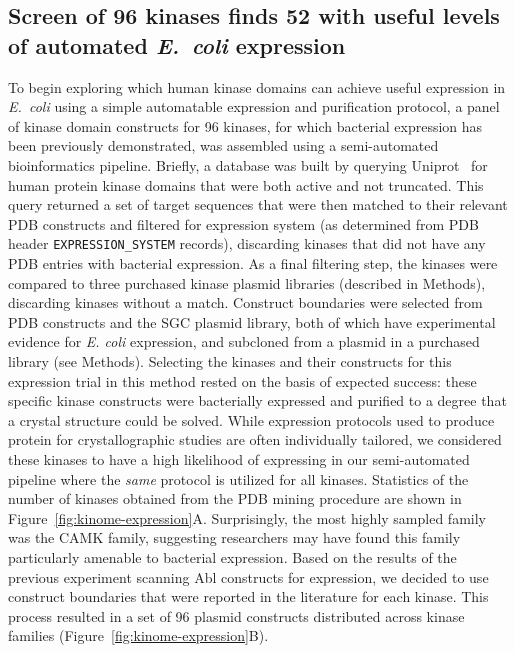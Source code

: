 \documentclass[phd,tocprelim]{cornell}
\begin{document}
\subsection{Screen of 96 kinases finds 52 with useful levels of automated \emph{E.~coli} expression}
To begin exploring which human kinase domains can achieve useful expression in \emph{E.~coli} using a simple automatable expression and purification protocol, a panel of kinase domain constructs for 96 kinases, for which bacterial expression has been previously demonstrated, was assembled using a semi-automated bioinformatics pipeline. 
Briefly, a database was built by querying Uniprot~\citep{uniprot:2017} for human protein kinase domains that were both active and not truncated. 
This query returned a set of target sequences that were then matched to their relevant PDB constructs and filtered for expression system (as determined from PDB header {\tt EXPRESSION\_SYSTEM} records), discarding kinases that did not have any PDB entries with bacterial expression. 
As a final filtering step, the kinases were compared to three purchased kinase plasmid libraries (described in Methods), discarding kinases without a match. Construct boundaries were selected from PDB constructs and the SGC plasmid library, both of which have experimental evidence for \emph{E. coli} expression, and subcloned from a plasmid in a purchased library (see Methods).
Selecting the kinases and their constructs for this expression trial in this method rested on the basis of expected success: these specific kinase constructs were bacterially expressed and purified to a degree that a crystal structure could be solved. 
While expression protocols used to produce protein for crystallographic studies are often individually tailored, we considered these kinases to have a high likelihood of expressing in our semi-automated pipeline where the \emph{same} protocol is utilized for all kinases. 
Statistics of the number of kinases obtained from the PDB mining procedure are shown in Figure~\ref{fig:kinome-expression}A. 
Surprisingly, the most highly sampled family was the CAMK family, suggesting researchers may have found this family particularly amenable to bacterial expression.
Based on the results of the previous experiment scanning Abl constructs for expression, we decided to use construct boundaries that were reported in the literature for each kinase. 
This process resulted in a set of 96 plasmid constructs distributed across kinase families (Figure~\ref{fig:kinome-expression}B). 
\end{document}
